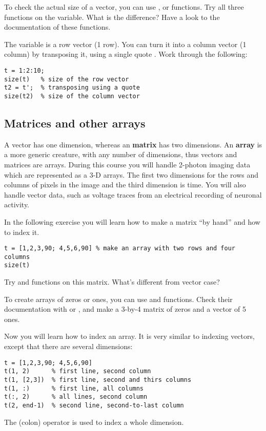 \documentclass{article}
\begin{document}
To check the actual size of a vector, you can use ,  or  functions.
Try all three functions on the  variable. What is the difference?
Have a look to the documentation of these functions.

The variable  is a row vector (1 row).
You can turn it into a column vector (1 column) by transposing it, using a single quote .
Work through the following:
\begin{lstlisting}
t = 1:2:10;
size(t)   % size of the row vector
t2 = t';  % transposing using a quote
size(t2)  % size of the column vector
\end{lstlisting}


\subsection*{Matrices and other arrays}

A vector has one dimension, whereas an \textbf{matrix} has two dimensions.
An \textbf{array} is a more generic creature, with any number of dimensions, thus vectors and matrices are arrays.
During this course you will handle 2-photon imaging data which are represented as a 3-D arrays.
The first two dimensions for the rows and columns of pixels in the image and the third dimension is time.
You will also handle vector data, such as voltage traces from an electrical recording of neuronal activity.

In the following exercise you will learn how to make a matrix ``by hand'' and how to index it.
\begin{lstlisting}
t = [1,2,3,90; 4,5,6,90] % make an array with two rows and four columns
size(t)
\end{lstlisting}
Try  and  functions on this matrix.
What's different from vector case?

To create arrays of zeros or ones, you can use  and  functions.
Check their documentation with  or , and make a 3-by-4 matrix of zeros and a vector of 5 ones.

Now you will learn how to index an array.
It is very similar to indexing vectors, except that there are several dimensions:
\begin{lstlisting}
t = [1,2,3,90; 4,5,6,90]
t(1, 2)      % first line, second column
t(1, [2,3])  % first line, second and thirs columns
t(1, :)      % first line, all columns
t(:, 2)      % all lines, second column
t(2, end-1)  % second line, second-to-last column
\end{lstlisting}
The \mcode{:} (colon) operator is used to index a whole dimension.
\end{document}
